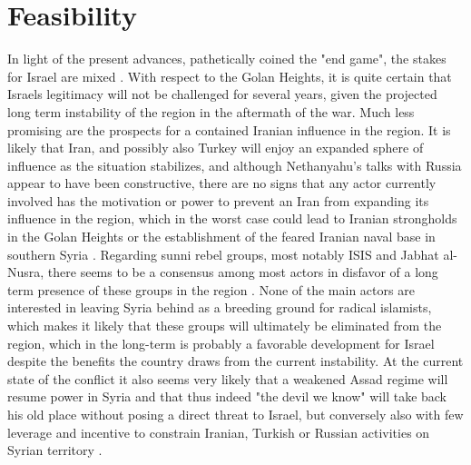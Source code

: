 \documentclass[a4paper]{article}\twocolumn
\begin{document}
\section{Feasibility}%
In light of the present advances, pathetically coined the "end game", the stakes for Israel are mixed \cite{aronson_2017}. With respect to the Golan Heights, it is quite certain that Israels legitimacy will not be challenged for several years, given the projected long term instability of the region in the aftermath of the war. Much less promising are the prospects for a contained Iranian influence in the region. It is likely that Iran, and possibly also Turkey will enjoy an expanded sphere of influence as the situation stabilizes, and although Nethanyahu's talks with Russia appear to have been constructive, there are no signs that any actor currently involved has the motivation or power to prevent an Iran from expanding its influence in the region, which in the worst case could lead to Iranian strongholds in the Golan Heights or the establishment of the feared Iranian naval base in southern Syria \cite{friedman_2016,ravid_2017,nethanyahu2015}. Regarding sunni rebel groups, most notably ISIS and Jabhat al-Nusra, there seems to be a consensus among most actors in disfavor of a long term presence of these groups in the region  \cite{ravid_2017}. None of the main actors are interested in leaving Syria behind as a breeding ground for radical islamists, which makes it likely that these groups will ultimately be eliminated from the region, which in the long-term is probably a favorable development for Israel despite the benefits the country draws from the current instability. At the current state of the conflict it also seems very likely that a weakened Assad regime will resume power in Syria and that thus indeed "the devil we know" will take back his old place without posing a direct threat to Israel, but conversely also with few leverage and incentive to constrain Iranian, Turkish or Russian activities on Syrian territory \cite{timesofisrael_2013,frenkel_boyes_2013}.
\end{document}
